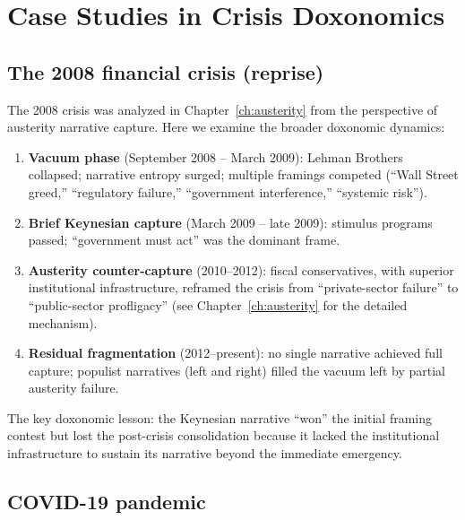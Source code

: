 \section{Case Studies in Crisis Doxonomics}
\label{sec:ch29-cases}

\subsection{The 2008 financial crisis (reprise)}

The 2008 crisis was analyzed in Chapter~\ref{ch:austerity} from the perspective of austerity narrative capture.
Here we examine the broader doxonomic dynamics:

\begin{enumerate}[nosep]
  \item \textbf{Vacuum phase} (September 2008 -- March 2009): Lehman Brothers collapsed; narrative entropy surged; multiple framings competed (``Wall Street greed,'' ``regulatory failure,'' ``government interference,'' ``systemic risk'').
  \item \textbf{Brief Keynesian capture} (March 2009 -- late 2009): stimulus programs passed; ``government must act'' was the dominant frame.
  \item \textbf{Austerity counter-capture} (2010--2012): fiscal conservatives, with superior institutional infrastructure, reframed the crisis from ``private-sector failure'' to ``public-sector profligacy'' (see Chapter~\ref{ch:austerity} for the detailed mechanism).
  \item \textbf{Residual fragmentation} (2012--present): no single narrative achieved full capture; populist narratives (left and right) filled the vacuum left by partial austerity failure.
\end{enumerate}

The key doxonomic lesson: the Keynesian narrative ``won'' the initial framing contest but lost the post-crisis consolidation because it lacked the institutional infrastructure to sustain its narrative beyond the immediate emergency.

\subsection{COVID-19 pandemic}

